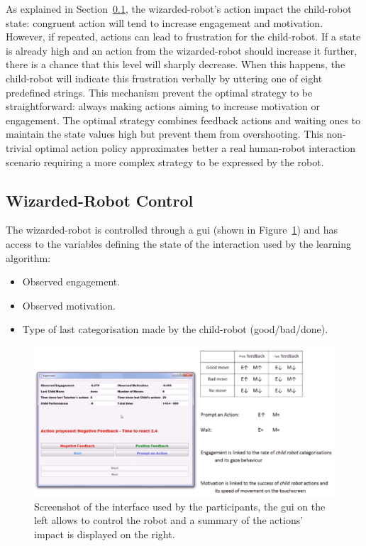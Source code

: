 As explained in Section~\ref{ssec:woz_wizarded_robot}, the wizarded-robot's action impact the child-robot state: congruent action will tend to increase engagement and motivation. However, if repeated, actions can lead to frustration for the child-robot. If a state is already high and an action from the wizarded-robot should increase it further, there is a chance that this level will sharply decrease. When this happens, the child-robot will indicate this frustration verbally by uttering one of eight predefined strings. This mechanism prevent the optimal strategy to be straightforward: always making actions aiming to increase motivation or engagement. The optimal strategy combines feedback actions and waiting ones to maintain the state values high but prevent them from overshooting. This non-trivial optimal action policy approximates better a real human-robot interaction scenario requiring a more complex strategy to be expressed by the robot.

\subsection{Wizarded-Robot Control}
\label{ssec:woz_wizarded_robot}
The wizarded-robot is controlled through a \gls{gui} (shown in Figure~\ref{fig:woz_gui}) and has access to the variables defining the state of the interaction used by the learning algorithm:
\begin{itemize}
	\item Observed engagement.
	\item Observed motivation.
	\item Type of last categorisation made by the child-robot (good/bad/done).
\end{itemize}

\begin{figure}[ht]
	\centering
	\includegraphics[width=.9\textwidth]{GUI-woz.png}
	\caption{Screenshot of the interface used by the participants, the \gls{gui} on the left allows to control the robot and a summary of the actions' impact is displayed on the right.}
	\label{fig:woz_gui}
\end{figure}

